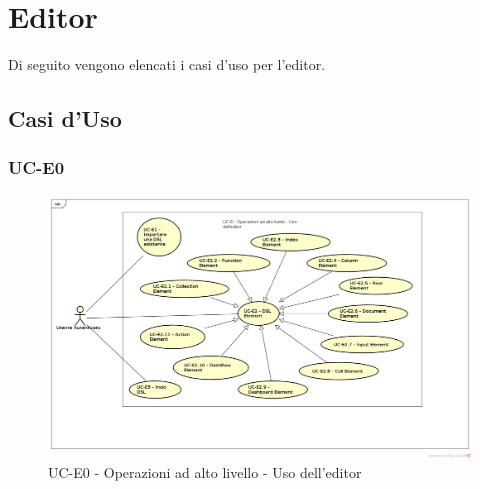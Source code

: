\section{Editor}

Di seguito vengono elencati i casi d'uso per l'editor.

\subsection{Casi d'Uso}


\subsubsection{UC-E0}

    \begin{figure}[H]
      \begin{center}
        \includegraphics[width=12cm]{res/img/UCEditor/UC-E}
      \caption{UC-E0 - Operazioni ad alto livello - Uso dell'editor}
      \end{center} 
    \end{figure}    
    
